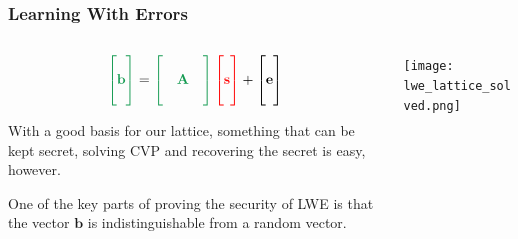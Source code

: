 \documentclass[
aspectratio=169, %
t, %
onlytextwidth, %
10pt, %
]{beamer}
\begin{document}

\begin{frame}
    \frametitle{Learning With Errors}
    \begin{columns}[T] %
        \begin{column}{0.48\linewidth} %
            \begin{tcolorbox}[colback=ICLBlue!5!white,colframe=ICLBlue,title=Learning With Errors Problem (LWE)]
                \[
                    \color{ForestGreen} \begin{bmatrix} \\ \mathbf{b} \\ \\ \end{bmatrix} \color{black} = \color{ForestGreen} \begin{bmatrix} & & \\ & \mathbf{A} & \\ & & \end{bmatrix} \color{red} \begin{bmatrix} \\  \mathbf{s} \\ \\ \end{bmatrix} \color{black} + \begin{bmatrix} \\ \mathbf{e} \\ \\ \end{bmatrix}
                \]
            \end{tcolorbox}

            With a good basis for our lattice, something that can be kept secret, solving CVP and recovering the secret is easy, however.

            One of the key parts of proving the security of LWE is that the vector \(\mathbf{b}\) is indistinguishable from a random vector.
        \end{column}
        \begin{column}{0.48\linewidth} %
            \texttt{[image: lwe\_lattice\_solved.png]} %
        \end{column}
    \end{columns}
\end{frame}
\end{document}
